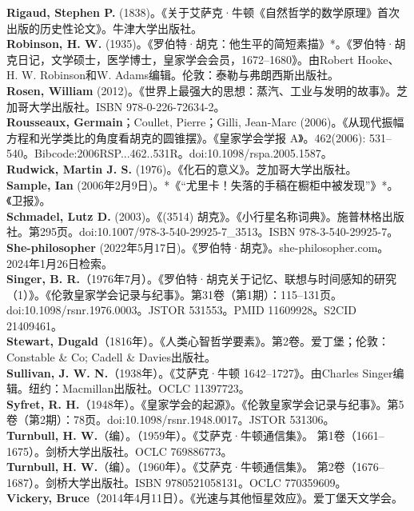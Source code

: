 \textbf{Rigaud, Stephen P.} (1838)。《关于艾萨克·牛顿《自然哲学的数学原理》首次出版的历史性论文》。牛津大学出版社。\\
\textbf{Robinson, H. W.} (1935)。《罗伯特·胡克：他生平的简短素描》*。《罗伯特·胡克日记，文学硕士，医学博士，皇家学会会员，1672–1680》。由Robert Hooke、H. W. Robinson和W. Adams编辑。伦敦：泰勒与弗朗西斯出版社。\\
\textbf{Rosen, William }(2012)。《世界上最强大的思想：蒸汽、工业与发明的故事》。芝加哥大学出版社。ISBN 978-0-226-72634-2。\\
\textbf{Rousseaux, Germain}；Coullet, Pierre；Gilli, Jean-Marc (2006)。《从现代振幅方程和光学类比的角度看胡克的圆锥摆》。《皇家学会学报 A》。462(2006): 531–540。Bibcode:2006RSP...462..531R。doi:10.1098/rspa.2005.1587。\\
\textbf{Rudwick, Martin J. S.} (1976)。《化石的意义》。芝加哥大学出版社。\\
\textbf{Sample, Ian} (2006年2月9日)。*《“尤里卡！失落的手稿在橱柜中被发现”》*。《卫报》。\\
\textbf{Schmadel, Lutz D.} (2003)。《(3514) 胡克》。《小行星名称词典》。施普林格出版社。第295页。doi:10.1007/978-3-540-29925-7_3513。ISBN 978-3-540-29925-7。\\
\textbf{She-philosopher} (2022年5月17日)。《罗伯特·胡克》。she-philosopher.com。2024年1月26日检索。\\
\textbf{Singer, B. R.}（1976年7月）。《罗伯特·胡克关于记忆、联想与时间感知的研究（1）》。《伦敦皇家学会记录与纪事》。第31卷（第1期）：115–131页。doi:10.1098/rsnr.1976.0003。JSTOR 531553。PMID 11609928。S2CID 21409461。\\
\textbf{Stewart, Dugald}（1816年）。《人类心智哲学要素》。第2卷。爱丁堡；伦敦：Constable & Co; Cadell & Davies出版社。\\
\textbf{Sullivan, J. W. N.}（1938年）。《艾萨克·牛顿 1642–1727》。由Charles Singer编辑。纽约：Macmillan出版社。OCLC 11397723。\\
\textbf{Syfret, R. H.}（1948年）。《皇家学会的起源》。《伦敦皇家学会记录与纪事》。第5卷（第2期）：78页。doi:10.1098/rsnr.1948.0017。JSTOR 531306。\\
\textbf{Turnbull, H. W.}（编）。（1959年）。《艾萨克·牛顿通信集》。 第1卷（1661–1675）。剑桥大学出版社。OCLC 769886773。\\
\textbf{Turnbull, H. W.}（编）。（1960年）。《艾萨克·牛顿通信集》。 第2卷（1676–1687）。剑桥大学出版社。ISBN 9780521058131。OCLC 770359609。\\
\textbf{Vickery, Bruce}（2014年4月11日）。《光速与其他恒星效应》。爱丁堡天文学会。\\
